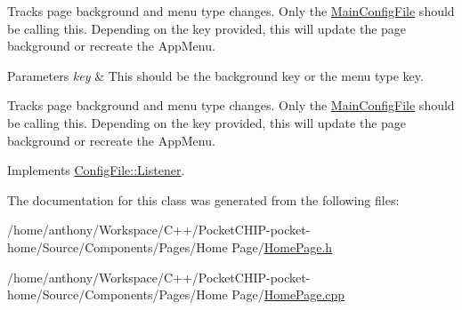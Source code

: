 Tracks page background and menu type changes. Only the \mbox{\hyperlink{classMainConfigFile}{Main\+Config\+File}} should be calling this. Depending on the key provided, this will update the page background or recreate the App\+Menu.


\begin{DoxyParams}{Parameters}
{\em key} & This should be the background key or the menu type key.\\
\hline
\end{DoxyParams}
Tracks page background and menu type changes. Only the \mbox{\hyperlink{classMainConfigFile}{Main\+Config\+File}} should be calling this. Depending on the key provided, this will update the page background or recreate the App\+Menu. 

Implements \mbox{\hyperlink{classConfigFile_1_1Listener}{Config\+File\+::\+Listener}}.



The documentation for this class was generated from the following files\+:\begin{DoxyCompactItemize}
\item 
/home/anthony/\+Workspace/\+C++/\+Pocket\+C\+H\+I\+P-\/pocket-\/home/\+Source/\+Components/\+Pages/\+Home Page/\mbox{\hyperlink{HomePage_8h}{Home\+Page.\+h}}\item 
/home/anthony/\+Workspace/\+C++/\+Pocket\+C\+H\+I\+P-\/pocket-\/home/\+Source/\+Components/\+Pages/\+Home Page/\mbox{\hyperlink{HomePage_8cpp}{Home\+Page.\+cpp}}\end{DoxyCompactItemize}
